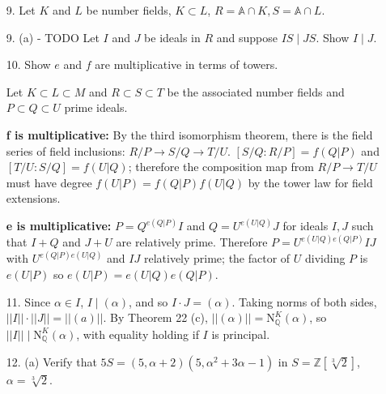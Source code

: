 \documentclass{article}
\newcommand{\Q}[0]{\mathbb{Q}}
\newcommand{\Z}[0]{\mathbb{Z}}
\newcommand{\p}[0]{\mathfrak{p}}
\newcommand{\q}[0]{\mathfrak{q}}
\newcommand{\norm}[0]{\text{N}}
\newcommand{\ringofintegers}[1]{\mathbb{A} \cap #1}
\begin{document}
\begin{enumerate}
\item[9.] Let $K$ and $L$ be number fields, $K \subset L$, $R = \ringofintegers{K}, S = \ringofintegers{L}$.

\item[9. (a) - TODO] Let $I$ and $J$ be ideals in $R$ and suppose $IS \mid JS$.  Show $I \mid J$.



\item[10.] Show $e$ and $f$ are multiplicative in terms of towers.

Let $K \subset L \subset M$ and $R \subset S \subset T$ be the associated number fields and $P \subset Q \subset U$ prime ideals.

{\bf f is multiplicative:} By the third isomorphism theorem, there is the field series of field inclusions: $R / P \to S / Q \to T / U$.  $[S / Q : R / P] = f(Q|P)$ and $[T/U : S/Q] = f(U|Q)$; therefore the composition map from $R / P \to T / U$  must have degree $f(U|P) = f(Q|P)f(U|Q)$ by the tower law for field extensions.

{\bf e is multiplicative:} $P = Q^{e(Q|P)} I$ and $Q = U^{e(U|Q)} J$ for ideals $I, J$ such that $I + Q$ and $J + U$ are relatively prime.  Therefore $P = U^{e(U|Q)e(Q|P)} IJ$ with $U^{e(Q|P)e(U|Q)}$ and $IJ$ relatively prime; the factor of $U$ dividing $P$ is $e(U|P)$ so $e(U|P) = e(U|Q)e(Q|P)$.

\item[11.] Since $\alpha \in I$, $I \mid (\alpha)$, and so $I \cdot J = (\alpha)$.  Taking norms of both sides, $||I|| \cdot ||J|| = || (a) ||$.  By Theorem 22 (c), $|| (\alpha) || = \norm^{K}_{\Q}(\alpha)$, so $||I|| \mid \norm^{K}_{\Q}(\alpha)$, with equality holding if $I$ is principal.

\item[12. (a)] Verify that $5S = (5, \alpha + 2)(5, \alpha^2 + 3\alpha - 1)$ in $S = \Z[\sqrt[3]{2}]$, $\alpha = \sqrt[3]{2}$.


\end{enumerate}
\end{document}

